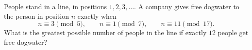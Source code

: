 People stand in a line, in positions $1,2,3,\dots$. A company gives free dogwater to the person in position $n$ exactly when
\[n\equiv3\pmod5,\qquad n\equiv1\pmod7,\qquad n\equiv11\pmod{17}.\]
What is the greatest possible number of people in the line if exactly $12$ people get free dogwater?
